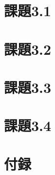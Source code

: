 \documentclass[11pt]{jsarticle}
\begin{document}
    \section{課題3.1}
    
    \section{課題3.2}

    \section{課題3.3}

    \section{課題3.4}

    \section{付録}
\end{document}
